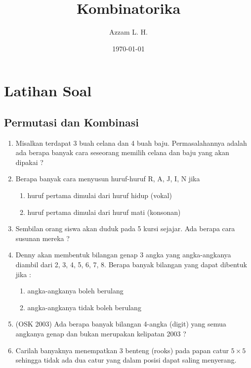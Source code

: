 \documentclass[12pt]{scrartcl}
\begin{document}
	\title{Kombinatorika} %
	\date{\today}
	\author{Azzam L. H.}
	\maketitle

\renewcommand*\contentsname{Daftar Isi}
\tableofcontents

\newpage
\section{Latihan Soal}

\subsection{Permutasi dan Kombinasi}
\begin{enumerate}
    \item Misalkan terdapat 3 buah celana dan 4 buah baju. Permasalahannya adalah ada berapa banyak cara 
seseorang memilih celana dan baju yang akan dipakai ?

    \item Berapa banyak cara menyusun huruf-huruf R, A, J, I, N jika 
\begin{enumerate}
    \item huruf pertama dimulai dari huruf hidup (vokal) 
    \item huruf pertama dimulai dari huruf mati (konsonan) 
\end{enumerate}

    \item Sembilan orang siswa akan duduk pada 5 kursi sejajar. Ada berapa cara susunan mereka ? 
    
    \item Denny akan membentuk bilangan genap 3 angka yang angka-angkanya diambil dari 2, 3, 4, 5, 6, 7, 8. 
Berapa banyak bilangan yang dapat dibentuk jika : 
    \begin{enumerate}
        \item angka-angkanya boleh berulang 
\item angka-angkanya tidak boleh berulang
    \end{enumerate}
    
    \item (OSK 2003) Ada berapa banyak bilangan 4-angka (digit) yang semua angkanya genap dan bukan 
merupakan kelipatan 2003 ?
    \item  Carilah banyaknya menempatkan 3 benteng (rooks) pada papan catur $5 \times 5$ sehingga
tidak ada dua catur yang dalam posisi dapat saling menyerang.


\end{enumerate}
\end{document}
